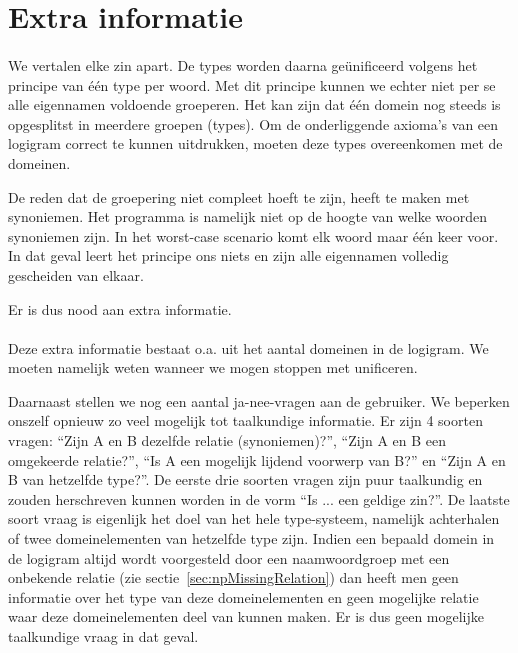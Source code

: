 \section{Extra informatie}
\paragraph{} We vertalen elke zin apart. De types worden daarna geünificeerd volgens het principe van één type per woord. Met dit principe kunnen we echter niet per se alle eigennamen voldoende groeperen. Het kan zijn dat één domein nog steeds is opgesplitst in meerdere groepen (types). Om de onderliggende axioma's van een logigram correct te kunnen uitdrukken, moeten deze types overeenkomen met de domeinen.

De reden dat de groepering niet compleet hoeft te zijn, heeft te maken met synoniemen. Het programma is namelijk niet op de hoogte van welke woorden synoniemen zijn. In het worst-case scenario komt elk woord maar één keer voor. In dat geval leert het principe ons niets en zijn alle eigennamen volledig gescheiden van elkaar.

Er is dus nood aan extra informatie.

\paragraph{} Deze extra informatie bestaat o.a. uit het aantal domeinen in de logigram. We moeten namelijk weten wanneer we mogen stoppen met unificeren.

Daarnaast stellen we nog een aantal ja-nee-vragen aan de gebruiker. We beperken onszelf opnieuw zo veel mogelijk tot taalkundige informatie. Er zijn 4 soorten vragen: ``Zijn A en B dezelfde relatie (synoniemen)?'', ``Zijn A en B een omgekeerde relatie?'', ``Is A een mogelijk lijdend voorwerp van B?'' en ``Zijn A en B van hetzelfde type?''. De eerste drie soorten vragen zijn puur taalkundig en zouden herschreven kunnen worden in de vorm ``Is ... een geldige zin?''. De laatste soort vraag is eigenlijk het doel van het hele type-systeem, namelijk achterhalen of twee domeinelementen van hetzelfde type zijn. Indien een bepaald domein in de logigram altijd wordt voorgesteld door een naamwoordgroep met een onbekende relatie (zie sectie~\ref{sec:npMissingRelation}) dan heeft men geen informatie over het type van deze domeinelementen en geen mogelijke relatie waar deze domeinelementen deel van kunnen maken. Er is dus geen mogelijke taalkundige vraag in dat geval.

